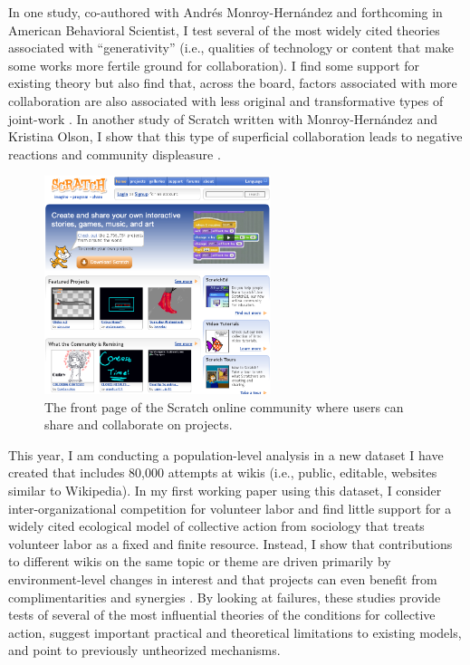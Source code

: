 \documentclass[10pt]{memoir}
\begin{document}
In one study, co-authored with Andrés Monroy-Hernández and forthcoming
in American Behavioral Scientist, I test several of the most widely
cited theories associated with ``generativity'' (i.e., qualities of
technology or content that make some works more fertile ground for
collaboration). I find some support for existing theory but also find
that, across the board, factors associated with more collaboration are
also associated with less original and transformative types of
joint-work \cite{hill_remixing_2012}. In another study of Scratch
written with Monroy-Hernández and Kristina Olson, I show that this type
of superficial collaboration leads to negative reactions and community
displeasure \cite{hill_responses_2010}.

\begin{figure}
 \vspace{-1em}
 \begin{centering}
 \includegraphics[width=2.6in]{figures/frontpage_modified-topremix.png}
  \caption{The front page of the Scratch online community where users
    can share and collaborate on projects.}
 \label{fig:scratchfrontpage}
 \end{centering}
 \vspace{-1.5em}
\end{figure}

This year, I am conducting a population-level analysis in a new
dataset I have created that includes 80,000 attempts at wikis (i.e.,
public, editable, websites similar to Wikipedia). In my first working
paper using this dataset, I consider inter-organizational competition
for volunteer labor and find little support for a widely cited
ecological model of collective action from sociology that treats
volunteer labor as a fixed and finite resource. Instead, I show that
contributions to different wikis on the same topic or theme are driven
primarily by environment-level changes in interest and that projects
can even benefit from complimentarities and synergies
\cite{hill_is_2012}.  By looking at failures, these studies provide
tests of several of the most influential theories of the conditions
for collective action, suggest important practical and theoretical
limitations to existing models, and point to previously untheorized
mechanisms.
\end{document}
